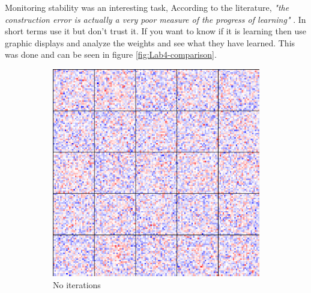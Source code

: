 \documentclass[a4paper]{article}
\begin{document}
Monitoring stability was an interesting task, According to the literature, \textit{"the construction error is actually a very poor measure of the progress of learning"} \cite{hinton2012practical}. In short terms use it but don't trust it. If you want to know if it is learning then use graphic displays and analyze the weights and see what they have learned. This was done and can be seen in figure \ref{fig:Lab4-comparison}. 
\begin{figure}[htb]
    \centering
    \begin{subfigure}[b]{0.45\textwidth}
        \centering
        \includegraphics[width=\textwidth]{Labs/Lab 4/Steinar/rf.iter000000.png}
        \caption{No iterations}
        \label{fig:Lab4-iter1}
    \end{subfigure}
    \begin{subfigure}[b]{0.45\textwidth}
        \centering

\end{subfigure}
\end{figure}
\end{document}
